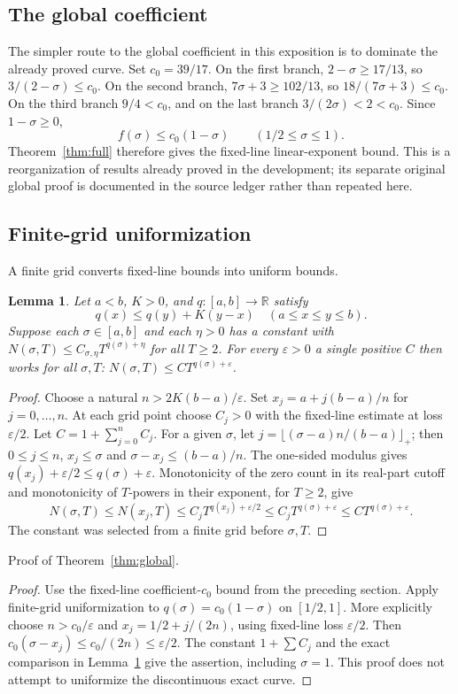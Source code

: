 \documentclass[11pt,a4paper,oneside]{article}
\newtheorem{lemma}[theorem]{Lemma}
\theoremstyle{definition}
\newcommand{\R}{\mathbb R}
\newcommand{\eps}{\varepsilon}
\numberwithin{equation}{section}
\begin{document}
\subsection{The global coefficient}
The simpler route to the global coefficient in this exposition is to dominate the already proved curve. Set $c_0=39/17$. On the first branch, $2-\sigma\ge17/13$, so $3/(2-\sigma)\le c_0$. On the second branch, $7\sigma+3\ge102/13$, so $18/(7\sigma+3)\le c_0$. On the third branch $9/4<c_0$, and on the last branch $3/(2\sigma)<2<c_0$. Since $1-\sigma\ge0$,
\[
 f(\sigma)\le c_0(1-\sigma)\qquad(1/2\le\sigma\le1).
\]
Theorem~\ref{thm:full} therefore gives the fixed-line linear-exponent bound. This is a reorganization of results already proved in the development; its separate original global proof is documented in the source ledger rather than repeated here.

\subsection{Finite-grid uniformization}
A finite grid converts fixed-line bounds into uniform bounds.
\begin{lemma}\label{lem:grid}
Let $a<b$, $K>0$, and $q:[a,b]\to\R$ satisfy
\[
 q(x)\le q(y)+K(y-x)\quad(a\le x\le y\le b).
\]
Suppose each $\sigma\in[a,b]$ and each $\eta>0$ has a constant with
$N(\sigma,T)\le C_{\sigma,\eta}T^{q(\sigma)+\eta}$ for all $T\ge2$.
For every $\eps>0$ a single positive $C$ then works for all $\sigma,T$:
$N(\sigma,T)\le CT^{q(\sigma)+\eps}$.
\end{lemma}
\begin{proof}
Choose a natural $n>2K(b-a)/\eps$. Set
$x_j=a+j(b-a)/n$ for $j=0,\ldots,n$.
At each grid point choose $C_j>0$ with the fixed-line estimate at loss
$\eps/2$. Let $C=1+\sum_{j=0}^n C_j$.
For a given $\sigma$, let
$j=\lfloor(\sigma-a)n/(b-a)\rfloor_+$; then $0\le j\le n$,
$x_j\le\sigma$ and $\sigma-x_j\le(b-a)/n$.
The one-sided modulus gives
$q(x_j)+\eps/2\le q(\sigma)+\eps$.
Monotonicity of the zero count in its real-part cutoff and
monotonicity of $T$-powers in their exponent, for $T\ge2$, give
\[
 N(\sigma,T)\le N(x_j,T)
 \le C_jT^{q(x_j)+\eps/2}
 \le C_jT^{q(\sigma)+\eps}\le CT^{q(\sigma)+\eps}.
\]
The constant was selected from a finite grid before $\sigma,T$.
\end{proof}
Proof of Theorem~\ref{thm:global}.
\begin{proof}
Use the fixed-line coefficient-$c_0$ bound from the preceding
section. Apply finite-grid uniformization to
$q(\sigma)=c_0(1-\sigma)$ on $[1/2,1]$.
More explicitly choose $n>c_0/\eps$ and
$x_j=1/2+j/(2n)$, using fixed-line loss $\eps/2$.
Then $c_0(\sigma-x_j)\le c_0/(2n)\le\eps/2$.
The constant $1+\sum C_j$ and the exact comparison in Lemma~\ref{lem:grid}
give the assertion, including $\sigma=1$.
This proof does not attempt to uniformize the discontinuous exact curve.
\end{proof}
\end{document}
